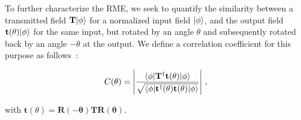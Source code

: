 \documentclass[aps,prl,twocolumn, amsmath,amssymb,superscriptaddress]{revtex4-2}
\DeclarePairedDelimiter\bra{\langle}{\rvert}
\DeclarePairedDelimiter\ket{\lvert}{\rangle}
\begin{document}
To further characterize the RME, we seek to quantify the similarity 
between a transmitted field $\mathbf{T}\ket{\phi}$
for a normalized input field $\ket{\phi}$, 
and the output field $\mathbf{t}(\theta)\ket{\phi}$
for the same input, but rotated by an angle $\theta$
and subsequently rotated back by an angle $-\theta$ at the output.
We define a correlation coefficient for this purpose as follows~\cite{yilmaz2021customizing}:

\begin{equation}
    C(\theta) = 
    \left|
    \frac{
        \bra{\phi}\mathbf{T}^\dagger\mathbf{t}(\theta)\ket{\phi}
    }{
        \sqrt{
            \bra{\phi}\mathbf{t}^\dagger(\theta)\mathbf{t}(\theta)\ket{\phi}
        }   
    }
    \right| \, ,
    \label{eq:corr_function}
\end{equation}

\noindent with $\mathbf{t}(\theta) = \mathbf{R(-\theta)}\mathbf{T}\mathbf{R(\theta)}$.
\end{document}
